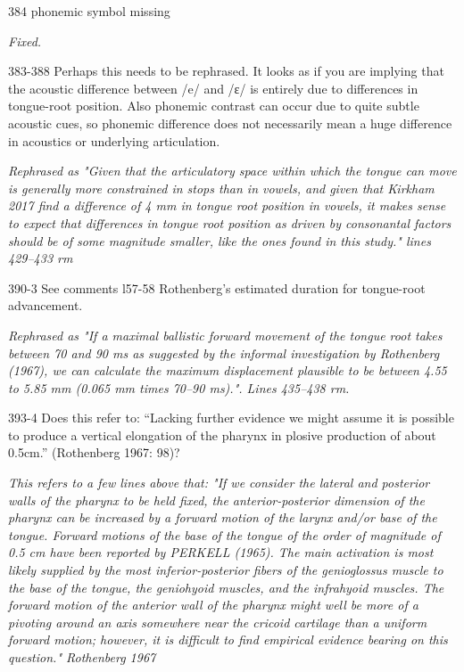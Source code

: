 \documentclass[]{article}
\begin{document}
384 phonemic symbol missing

\begin{adjustwidth}{1cm}{} \textit{
Fixed.
} \end{adjustwidth}

383-388 Perhaps this needs to be rephrased. It looks as if you are
implying that the acoustic difference between /e/ and /ɛ/ is entirely
due to differences in tongue-root position. Also phonemic contrast can
occur due to quite subtle acoustic cues, so phonemic difference does not
necessarily mean a huge difference in acoustics or underlying
articulation.

\begin{adjustwidth}{1cm}{} \textit{
Rephrased as "Given that the articulatory space within which the tongue can move is generally more constrained in stops than in vowels, and given that Kirkham 2017 find a difference of 4 mm in tongue root position in vowels, it makes sense to expect that differences in tongue root position as driven by consonantal factors should be of some magnitude smaller, like the ones found in this study." lines 429--433 rm
} \end{adjustwidth}

390-3 See comments l57-58 Rothenberg's estimated duration for
tongue-root advancement.

\begin{adjustwidth}{1cm}{} \textit{
Rephrased as "If a maximal ballistic forward movement of the tongue root takes between 70 and 90 ms as suggested by the informal investigation by Rothenberg (1967), we can calculate the maximum displacement plausible to be between 4.55 to 5.85 mm (0.065 mm times 70–90 ms).". Lines 435--438 rm.
} \end{adjustwidth}

393-4 Does this refer to: ``Lacking further evidence we might assume it
is possible to produce a vertical elongation of the pharynx in plosive
production of about 0.5cm.'' (Rothenberg 1967: 98)?

\begin{adjustwidth}{1cm}{} \textit{
This refers to a few lines above that: "If we consider the lateral and posterior walls of the pharynx to be held fixed, the anterior-posterior dimension of the pharynx can be increased by a forward motion of the larynx and/or base of the tongue. Forward motions of the base of the tongue of the order of magnitude of 0.5 cm have been reported by PERKELL (1965). The main activation is most likely supplied by the most inferior-posterior fibers of the genioglossus muscle to the base of the tongue, the geniohyoid muscles, and the infrahyoid muscles. The forward motion of the anterior wall of the pharynx might well be more of a pivoting around an axis somewhere near the cricoid cartilage than a uniform forward motion; however, it is difficult to find empirical evidence bearing on this question." Rothenberg 1967
} \end{adjustwidth}
\end{document}
